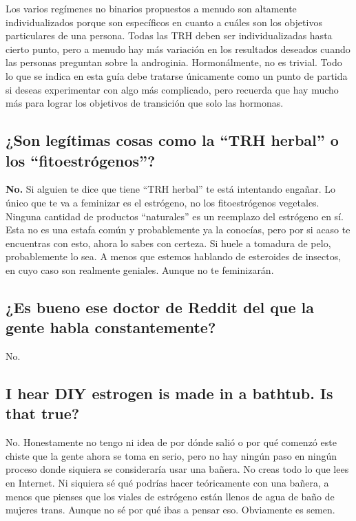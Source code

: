 \documentclass{article}
\begin{document}
Los varios regímenes no binarios propuestos a menudo son altamente individualizados porque son específicos en cuanto a cuáles son los objetivos particulares de una persona. Todas las TRH deben ser individualizadas hasta cierto punto, pero a menudo hay más variación en los resultados deseados cuando las personas preguntan sobre la androginia. Hormonálmente, no es trivial. Todo lo que se indica en esta guía debe tratarse únicamente como un punto de partida si deseas experimentar con algo más complicado, pero recuerda que hay mucho más para lograr los objetivos de transición que solo las hormonas.

\subsection{¿Son legítimas cosas como la “TRH herbal” o los “fitoestrógenos”?}

\textbf{No.} Si alguien te dice que tiene “TRH herbal” te está intentando engañar. Lo único que te va a feminizar es el estrógeno, no los fitoestrógenos vegetales. Ninguna cantidad de productos “naturales” es un reemplazo del estrógeno en sí. Esta no es una estafa común y probablemente ya la conocías, pero por si acaso te encuentras con esto, ahora lo sabes con certeza. Si huele a tomadura de pelo, probablemente lo sea. A menos que estemos hablando de esteroides de insectos, en cuyo caso son realmente geniales. Aunque no te feminizarán.

\subsection{¿Es bueno ese doctor de Reddit del que la gente habla constantemente?}

No.

\subsection{I hear DIY estrogen is made in a bathtub. Is that true?}

No. Honestamente no tengo ni idea de por dónde salió o por qué comenzó este chiste que la gente ahora se toma en serio, pero no hay ningún paso en ningún proceso donde siquiera se consideraría usar una bañera. No creas todo lo que lees en Internet. Ni siquiera sé qué podrías hacer teóricamente con una bañera, a menos que pienses que los viales de estrógeno están llenos de agua de baño de mujeres trans. Aunque no sé por qué ibas a pensar eso. Obviamente es semen.
\end{document}
